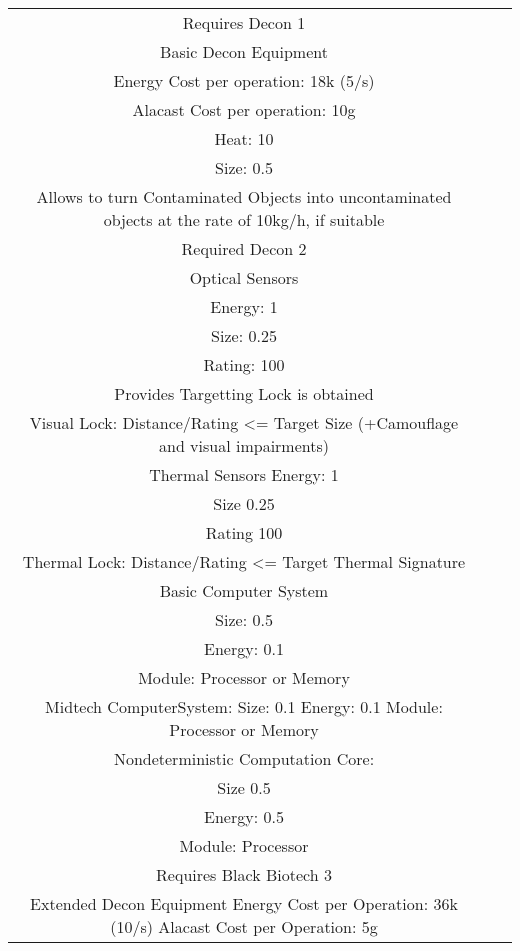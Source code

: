 \documentclass{article}
\begin{document}
\begin{tabular}{c|c|c}
    Requires Decon 1\\
    \newline
    Basic Decon Equipment \\
    Energy Cost per operation: 18k (5/s)\\
    Alacast Cost per operation: 10g\\
    Heat: 10 \\
    Size: 0.5\\
    Allows to turn Contaminated Objects into uncontaminated objects at the rate of 10kg/h, if suitable\\
    Required Decon 2\\
    \newline
    Optical Sensors\\
    Energy: 1\\
    Size: 0.25 \\
    Rating: 100\\
    Provides Targetting Lock is obtained\\
    Visual Lock: Distance/Rating <= Target Size (+Camouflage and visual impairments)\\
    \newline
    Thermal Sensors
    Energy: 1\\
    Size 0.25\\
    Rating 100\\
    Thermal Lock: Distance/Rating <= Target Thermal Signature\\
    \newline
    Basic Computer System\\
    Size: 0.5\\
    Energy: 0.1\\
    Module: Processor or Memory\\
    \newline
    Midtech \newline
    ComputerSystem:
    Size: 0.1
    Energy: 0.1
    Module: Processor or Memory\\
    \newline
    Nondeterministic Computation Core:\\
    Size 0.5\\
    Energy: 0.5\\
    Module: Processor\\
    Requires Black Biotech 3\\
    \newline
    Extended Decon Equipment
    Energy Cost per Operation: 36k (10/s)
    Alacast Cost per Operation: 5g\\

\end{tabular}
\end{document}
